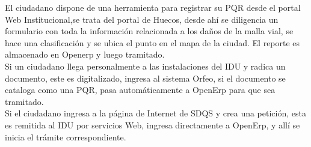 El ciudadano dispone de una herramienta para registrar su PQR desde el portal Web Institucional,se trata del portal de Huecos,
desde ahí se diligencia un formulario con toda la información relacionada a los daños de la malla vial, se hace una clasificación y se ubica el 
punto en el mapa de la ciudad. El reporte es almacenado en Openerp y luego tramitado.\\

Si un ciudadano llega personalmente a las instalaciones del IDU y radica un documento, este es digitalizado, ingresa al sistema Orfeo, si el 
documento se cataloga como una PQR, pasa automáticamente a OpenErp para que sea tramitado.\\

Si el ciudadano ingresa a la página de Internet de SDQS y crea una petición, esta es remitida al IDU por servicios Web, ingresa directamente a OpenErp, 
y allí se inicia el trámite correspondiente.\\




